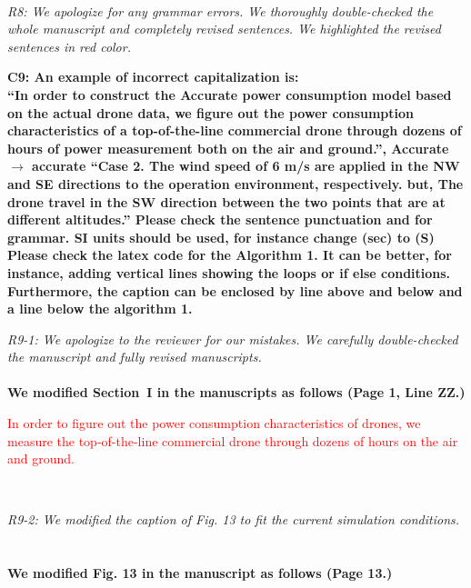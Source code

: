 \documentclass[onecolumn]{IEEEconf}
\begin{document}
\begin{description}
{	}
	~\\
	\item \textit
	{
	R8: We apologize for any grammar errors. We thoroughly double-checked the whole manuscript and completely revised sentences. We highlighted the revised sentences in red color. 
    }
    ~\\
    \item \textbf
    {
	C9: An example of incorrect capitalization is: \\
	``In order to construct the Accurate power consumption model based on the actual drone data, we figure out the power consumption characteristics of a top-of-the-line commercial drone through dozens of hours of power measurement both on the air and ground.'', Accurate $\rightarrow$ accurate
	``Case 2. The wind speed of 6 m/s are
	applied in the NW and SE directions to the operation environment, respectively. but, The drone travel in the SW direction between the two points that are at different altitudes.'' Please check the sentence punctuation and for grammar.
	SI units should be used, for instance change (sec) to (S)
	Please check the latex code for the Algorithm 1. It can be better, for instance, adding vertical lines showing the loops or if else conditions.
	Furthermore, the caption can be enclosed by line above and below and a line below the algorithm 1.
	}
	~\\
	\item \textit
	{
	R9-1: We apologize to the reviewer for our mistakes. We carefully double-checked the manuscript and fully revised manuscripts.
    }
    ~\\
	~\\
	\textbf{We modified Section~I in the manuscripts as follows (Page 1, Line ZZ.)}\\
    \begin{mdframed}[ linewidth=.75pt, userdefinedwidth=0.9\textwidth]
    \textcolor{red}{In order to figure out the power consumption characteristics of drones, we measure the top-of-the-line commercial drone through dozens of hours on the air and ground.}
    \end{mdframed} 
	~\\
	\item \textit
	{
	R9-2: We modified the caption of Fig. 13 to fit the current simulation conditions.
    }
    ~\\
	~\\
   \textbf{We modified Fig. 13 in the manuscript as follows (Page 13.)}\\
    \begin{mdframed}[ linewidth=.75pt, userdefinedwidth=0.9\textwidth]

\end{mdframed}
\end{description}
\end{document}
